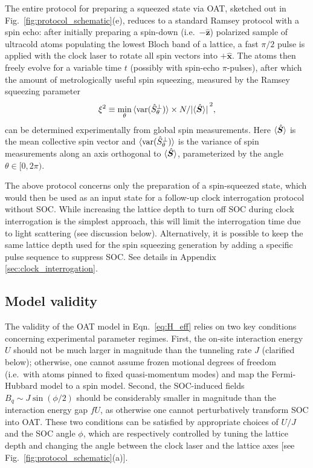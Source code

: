 \documentclass[aps,prx,superscriptaddress,notitlepage,twocolumn,longbibliography]{revtex4-2}
\renewcommand{\t}{\text} %
\renewcommand{\v}{\bm} %
\newcommand{\uv}[1]{\hat{\bm #1}} %
\begin{document}
The entire protocol for preparing a squeezed state via OAT, sketched out in Fig.~\ref{fig:protocol_schematic}(e), reduces to a standard Ramsey protocol with a spin echo: after initially preparing a spin-down (i.e.~$-\uv z$) polarized sample of ultracold atoms populating the lowest Bloch band of a lattice, a fast $\pi/2$ pulse is applied with the clock laser to rotate all spin vectors into $+\uv x$.
The atoms then freely evolve for a variable time $t$ (possibly with spin-echo $\pi$-pulses), after which the amount of metrologically useful spin squeezing, measured by the Ramsey squeezing parameter
\begin{align}
  \xi^2 \equiv
  \min_\theta \braket{\t{var}(\hat S^\perp_\theta)}
  \times N/\abs*{\braket{\hat{\v S}}}^2,
  \label{eq:sqz}
\end{align}
can be determined experimentally from global spin measurements.
Here $\braket{\hat{\v S}}$ is the mean collective spin vector and $\braket{\t{var}(\hat S^\perp_\theta)}$ is the variance of spin measurements along an axis orthogonal to $\braket{\hat{\v S}}$, parameterized by the angle $\theta\in[0,2\pi)$.

The above protocol concerns only the preparation of a spin-squeezed state, which would then be used as an input state for a follow-up clock interrogation protocol without SOC.
While increasing the lattice depth to turn off SOC during clock interrogation is the simplest approach, this will limit the interrogation time due to light scattering (see discussion below).
Alternatively, it is possible to keep the same lattice depth used for the spin squeezing generation by adding a specific pulse sequence to suppress SOC.
See details in Appendix \ref{sec:clock_interrogation}.

\subsection{Model validity}
\label{sec:validity}

The validity of the OAT model in Eqn.~\eqref{eq:H_eff} relies on two key conditions concerning experimental parameter regimes.
First, the on-site interaction energy $U$ should not be much larger in magnitude than the tunneling rate $J$ (clarified below); otherwise, one cannot assume frozen motional degrees of freedom (i.e.~with atoms pinned to fixed quasi-momentum modes) and map the Fermi-Hubbard model to a spin model.
Second, the SOC-induced fields $B_q\sim J\sin(\phi/2)$ should be considerably smaller in magnitude than the interaction energy gap $fU$, as otherwise one cannot perturbatively transform SOC into OAT.
These two conditions can be satisfied by appropriate choices of $U/J$ and the SOC angle $\phi$, which are respectively controlled by tuning the lattice depth and changing the angle between the clock laser and the lattice axes [see Fig.~\ref{fig:protocol_schematic}(a)].
\end{document}
